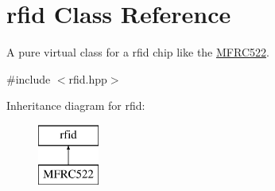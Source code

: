 \hypertarget{classrfid}{}\section{rfid Class Reference}
\label{classrfid}


A pure virtual class for a rfid chip like the \mbox{\hyperlink{class_m_f_r_c522}{M\+F\+R\+C522}}.  




{\ttfamily \#include $<$rfid.\+hpp$>$}

Inheritance diagram for rfid\+:\begin{figure}[H]
\begin{center}
\leavevmode
\includegraphics[height=2.000000cm]{classrfid}
\end{center}
\end{figure}
